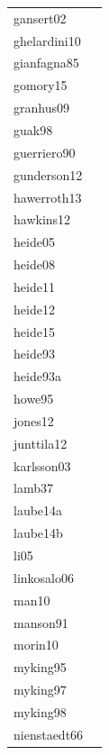\documentclass[11pt]{article}
\begin{document}
\begin{footnotesize}
\begin{longtable}{p{}p{}}
  gansert02 & \citep{Gianfagna:1985aa} \\ 
  ghelardini10 & \citep{Gomory:2015aa} \\ 
  gianfagna85 & \citep{Granhus:2009aa} \\ 
  gomory15 & \citep{Guak:1998aa} \\ 
  granhus09 & \citep{guerriero:1990} \\ 
  guak98 & \citep{Gunderson:2012aa} \\ 
  guerriero90 & \citep{Hawerroth:2013aa} \\ 
  gunderson12 & \citep{Hawkins:2012} \\ 
  hawerroth13 & \citep{Heide:2003aa} \\ 
  hawkins12 & \citep{Heide:2005aa} \\ 
  heide05 & \citep{Heide:2008aa} \\ 
  heide08 & \citep{Heide:2011aa} \\ 
  heide11 & \citep{Heide:2012aa} \\ 
  heide12 & \citep{Heide:2015aa} \\ 
  heide15 & \citep{Heide:1993} \\ 
  heide93 & \citep{Heide:1993a} \\ 
  heide93a & \citep{Howe:1995aa} \\ 
  howe95 & \citep{Jones:2012} \\ 
  jones12 & \citep{Junttila:2012aa} \\ 
  junttila12 & \citep{Karlsson:2003aa} \\ 
  karlsson03 & \citep{Lamb:1948aa} \\ 
  lamb37 & \citep{Laube:2014a} \\ 
  laube14a & \citep{Laube:2014b} \\ 
  laube14b & \citep{Li:2005aa} \\ 
  li05 & \citep{Linkosalo:2006aa} \\ 
  linkosalo06 & \citep{Man:2010aa} \\ 
  man10 & \citep{Manson:1991aa} \\ 
  manson91 & \citep{Morin:2010aa} \\ 
  morin10 & \citep{Myking:1995} \\ 
  myking95 & \citep{Myking:1997aa} \\ 
  myking97 & \citep{Myking:1998aa} \\ 
  myking98 & \citep{Nienstaedt:1966aa} \\ 
  nienstaedt66 & \citep{Nishimoto:1994aa} \\ 

\end{longtable}
\end{footnotesize}
\end{document}
